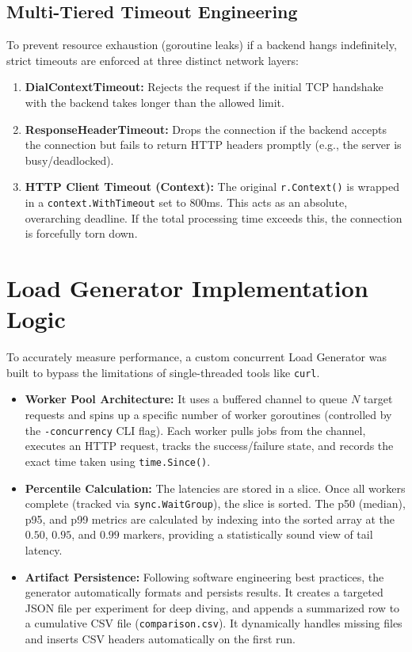 \documentclass[12pt,a4paper]{article}
\begin{document}
\subsection{Multi-Tiered Timeout Engineering}
To prevent resource exhaustion (goroutine leaks) if a backend hangs indefinitely, strict timeouts are enforced at three distinct network layers:
\begin{enumerate}
    \item \textbf{DialContextTimeout:} Rejects the request if the initial TCP handshake with the backend takes longer than the allowed limit.
    \item \textbf{ResponseHeaderTimeout:} Drops the connection if the backend accepts the connection but fails to return HTTP headers promptly (e.g., the server is busy/deadlocked).
    \item \textbf{HTTP Client Timeout (Context):} The original \texttt{r.Context()} is wrapped in a \texttt{context.WithTimeout} set to 800ms. This acts as an absolute, overarching deadline. If the total processing time exceeds this, the connection is forcefully torn down.
\end{enumerate}

\section{Load Generator Implementation Logic}
To accurately measure performance, a custom concurrent Load Generator was built to bypass the limitations of single-threaded tools like \texttt{curl}.
\begin{itemize}
    \item \textbf{Worker Pool Architecture:} It uses a buffered channel to queue $N$ target requests and spins up a specific number of worker goroutines (controlled by the \texttt{-concurrency} CLI flag). Each worker pulls jobs from the channel, executes an HTTP request, tracks the success/failure state, and records the exact time taken using \texttt{time.Since()}.
    \item \textbf{Percentile Calculation:} The latencies are stored in a slice. Once all workers complete (tracked via \texttt{sync.WaitGroup}), the slice is sorted. The p50 (median), p95, and p99 metrics are calculated by indexing into the sorted array at the $0.50$, $0.95$, and $0.99$ markers, providing a statistically sound view of tail latency.
    \item \textbf{Artifact Persistence:} Following software engineering best practices, the generator automatically formats and persists results. It creates a targeted JSON file per experiment for deep diving, and appends a summarized row to a cumulative CSV file (\texttt{comparison.csv}). It dynamically handles missing files and inserts CSV headers automatically on the first run.
\end{itemize}
\end{document}

